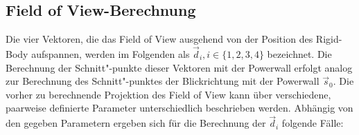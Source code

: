 \documentclass[]{article}
\newcommand{\POW}{Powerwall}
\newcommand{\FOV}{Field of View}
\begin{document}
\subsection{\FOV{}-Berechnung}
Die vier Vektoren, die das \FOV{} ausgehend von der Position des Rigid-Body aufspannen, werden im Folgenden als $\overrightarrow{d}_{i}, i \in \lbrace 1,2,3,4\rbrace$ bezeichnet.
Die Berechnung der Schnitt"-punkte dieser Vektoren mit der \POW{} erfolgt analog zur Berechnung des Schnitt"-punktes der Blickrichtung mit der \POW{} $\overrightarrow{s}_{0}$.
Die vorher zu berechnende Projektion des \FOV{} kann über verschiedene, paarweise definierte Parameter unterschiedlich beschrieben werden.
Abhängig von den gegeben Parametern ergeben sich für die Berechnung der $\overrightarrow{d}_{i}$ folgende Fälle:
\end{document}
